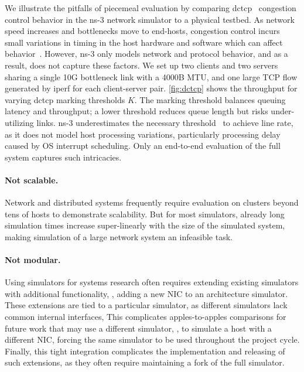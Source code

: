We illustrate the pitfalls of piecemeal evaluation by comparing
dctcp~\cite{alizadeh:dctcp} congestion control behavior
in the ns-3 network simulator to a physical testbed.
%
As network speed increases and bottlenecks move to end-hosts,
congestion control incurs small variations in timing in the host
hardware and software which can affect
behavior~\cite{alizadeh:dctcp,mittal:timely,kumar:swift}.
%
However, ns-3 only models network and protocol behavior, and as
a result, does not capture these factors.
%
We set up two clients and two servers sharing a single 10G
bottleneck link with a 4000B MTU, and one large TCP flow
generated by iperf for each client-server pair.
%
\autoref{fig:dctcp} shows the throughput for varying dctcp
marking thresholds $K$.
%
The marking threshold balances queuing latency and throughput; a lower
threshold reduces queue length but risks under-utilizing links.
%
ns-3 underestimates the necessary threshold~\cite{alizadeh:dctcp} to
achieve line rate, as it does not model host processing variations,
particularly processing delay caused by OS interrupt scheduling.
%
Only an end-to-end evaluation of the full system captures such
intricacies.

\paragraph{Not scalable.}
Network and distributed systems frequently require evaluation on clusters beyond
tens of hosts to demonstrate scalability.
%
But for most simulators, already long simulation times increase super-linearly
with the size of the simulated system, making simulation of a large network
system an infeasible task.

\paragraph{Not modular.}
Using simulators for systems research often requires extending
existing simulators with additional functionality, \eg, adding a new
NIC to an architecture simulator.
%
These extensions are tied to a particular simulator, as different
simulators lack common internal interfaces,
%
This complicates apples-to-apples comparisons for future work that may use a
different simulator, \eg, to simulate a host with a different NIC, forcing the
same simulator to be used throughout the project cycle.
%
Finally, this tight integration complicates the implementation and releasing of
such extensions, as they often require maintaining a fork of the full simulator.
